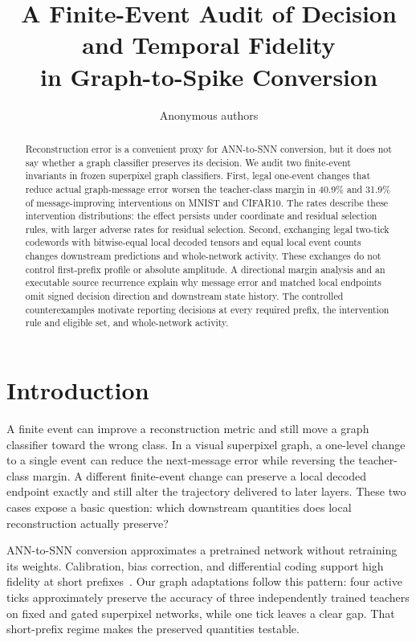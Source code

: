\documentclass[10pt,twocolumn,letterpaper]{article}
\title{A Finite-Event Audit of Decision and Temporal Fidelity\\in Graph-to-Spike Conversion}
\author{Anonymous authors}
\begin{document}
\maketitle
\begin{abstract}
Reconstruction error is a convenient proxy for ANN-to-SNN conversion, but it does not say whether a graph classifier preserves its decision. We audit two finite-event invariants in frozen superpixel graph classifiers. First, legal one-event changes that reduce actual graph-message error worsen the teacher-class margin in 40.9\% and 31.9\% of message-improving interventions on MNIST and CIFAR10. The rates describe these intervention distributions: the effect persists under coordinate and residual selection rules, with larger adverse rates for residual selection. Second, exchanging legal two-tick codewords with bitwise-equal local decoded tensors and equal local event counts changes downstream predictions and whole-network activity. These exchanges do not control first-prefix profile or absolute amplitude. A directional margin analysis and an executable source recurrence explain why message error and matched local endpoints omit signed decision direction and downstream state history. The controlled counterexamples motivate reporting decisions at every required prefix, the intervention rule and eligible set, and whole-network activity.
\end{abstract}

\section{Introduction}
A finite event can improve a reconstruction metric and still move a graph classifier toward the wrong class. In a visual superpixel graph, a one-level change to a single event can reduce the next-message error while reversing the teacher-class margin. A different finite-event change can preserve a local decoded endpoint exactly and still alter the trajectory delivered to later layers. These two cases expose a basic question: which downstream quantities does local reconstruction actually preserve?

ANN-to-SNN conversion approximates a pretrained network without retraining its weights. Calibration, bias correction, and differential coding support high fidelity at short prefixes~\cite{li2021,wu2024ftbc,huang2025}. Our graph adaptations follow this pattern: four active ticks approximately preserve the accuracy of three independently trained teachers on fixed and gated superpixel networks, while one tick leaves a clear gap. That short-prefix regime makes the preserved quantities testable.
\end{document}
